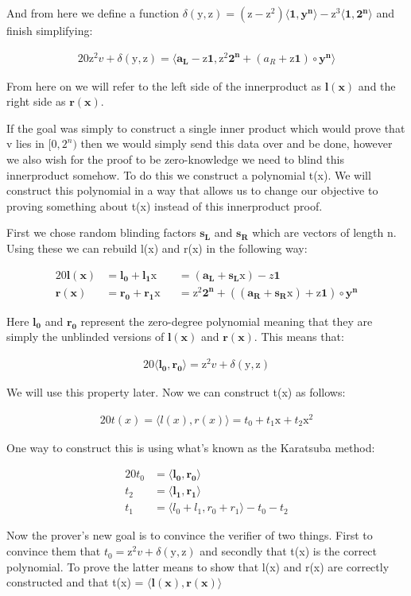\documentclass{article}
\newcommand{\eq}[1]{\begin{alignat*}{20}#1\end{alignat*}}
\renewcommand{\vec}[1]{\boldsymbol{#1}}
\newcommand{\ran}[1]{\mathrm{#1}}
\newcommand{\vecran}[1]{\mathbf{#1}}
\newcommand{\dotp}[2]{\langle #1, #2 \rangle}
\begin{document}
And from here we define a function $\delta(\ran{y},\ran{z}) = (\ran{z} - \ran{z^2})\dotp{\vec{1}}{\vecran{y^n}} - \ran{z^3}\dotp{\vec{1}}{\vec{2^n}}$ and finish simplifying:

\eq{
	\ran{z^2}v + \delta(\ran{y},\ran{z}) = \dotp{\vec{a_L}- \ran{z}\vec{1}}{\ran{z^2}\vec{2^n} + (a_R + \ran{z}\vec{1})\circ\vecran{y^n}}
}

From here on we will refer to the left side of the innerproduct as $\vec{l(x)}$ and the right side as $\vec{r(x)}$.

If the goal was simply to construct a single inner product which would prove that v lies in $[0,2^n)$ then we would simply send this data over and be done, however we also wish for the proof to be zero-knowledge we need to blind this innerproduct somehow. To do this we construct a polynomial t(x). We will construct this polynomial in a way that allows us to change our objective to proving something about t(x) instead of this innerproduct proof.

First we chose random blinding factors $\vecran{s_L}$ and $\vecran{s_R}$ which are vectors of length n. Using these we can rebuild l(x) and r(x) in the following way:

\eq{
	\vec{l(x)} &= \vec{l_0} + \vec{l_1}\ran{x} &&= (\vec{a_L} + \vec{s_L}\ran{x}) - z\vec{1}\\
	\vec{r(x)} &= \vec{r_0} + \vec{r_1}\ran{x} &&= \ran{z^2}\vec{2^n} + ((\vec{a_R} + \vec{s_R}\ran{x}) + \ran{z}\vec{1})\circ\vecran{y^n}
}

Here $\vec{l_0}$ and $\vec{r_0}$ represent the zero-degree polynomial meaning that they are simply the unblinded versions of $\vec{l(x)}$ and $\vec{r(x)}$. This means that:

\eq{
	\dotp{\vec{l_0}}{\vec{r_0}} = \ran{z^2}v + \delta(\ran{y},\ran{z})
}

We will use this property later. Now we can construct t(x) as follows:

\eq{
	t(x) = \dotp{l(x)}{r(x)} = t_0 + t_1\ran{x} + t_2\ran{x^2}
}

One way to construct this is using what's known as the Karatsuba method:

\eq{
	t_0 &= \dotp{\vec{l_0}}{\vec{r_0}}\\
	t_2 &= \dotp{\vec{l_1}}{\vec{r_1}}\\
	t_1 &= \dotp{l_0+l_1}{r_0 + r_1} - t_0 - t_2
}

Now the prover's new goal is to convince the verifier of two things. First to convince them that $t_0 = \ran{z^2}v + \delta(\ran{y},\ran{z})$ and secondly that t(x) is the correct polynomial. To prove the latter means to show that l(x) and r(x) are correctly constructed and that t(x) = $\dotp{\vec{l(x)}}{\vec{r(x)}}$
\end{document}
